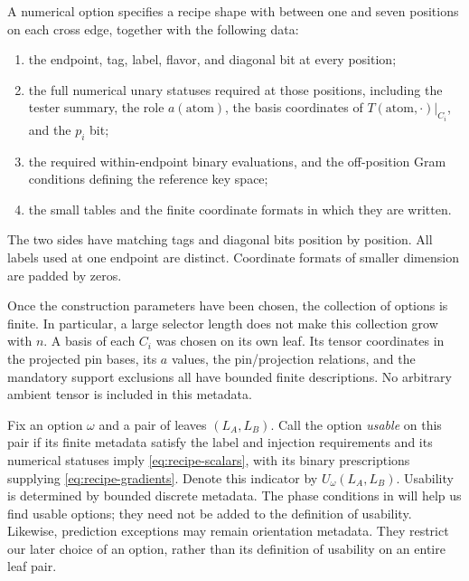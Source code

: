 \begin{definition}
\label{def:limit-option}
A numerical option specifies a recipe shape with between one and seven
positions on each cross edge, together with the following data:
\begin{enumerate}
\item the endpoint, tag, label, flavor, and diagonal bit at every position;
\item the full numerical unary statuses required at those positions,
including the tester summary, the role $a(\mathrm{atom})$, the basis
coordinates of $T(\mathrm{atom},\cdot)|_{C_i}$, and the $p_i$ bit;
\item the required within-endpoint binary evaluations, and the
off-position Gram conditions defining the reference key space;
\item the small tables and the finite coordinate formats in which they
are written.
\end{enumerate}
The two sides have matching tags and diagonal bits position by position.
All labels used at one endpoint are distinct. Coordinate formats of
smaller dimension are padded by zeros.
\end{definition}

Once the construction parameters have been chosen, the collection of
options is finite. In particular, a large selector length does not make
this collection grow with $n$. A basis of each $C_i$ was chosen on its
own leaf. Its tensor coordinates in the projected pin bases, its $a$
values, the pin/projection relations, and the mandatory support
exclusions all
have bounded finite descriptions. No arbitrary ambient tensor is included
in this metadata.

Fix an option $\omega$ and a pair of leaves $(L_A,L_B)$. Call the option
\emph{usable} on this pair if its finite metadata satisfy the label and
injection requirements and its numerical statuses imply
\eqref{eq:recipe-scalars}, with its binary prescriptions supplying
\eqref{eq:recipe-gradients}. Denote this indicator by
$U_\omega(L_A,L_B)$. Usability is determined by bounded discrete metadata.
The phase conditions in  will help us find
usable options; they need not be added to the definition of usability.
Likewise, prediction exceptions may remain orientation metadata. They
restrict our later choice of an option, rather than its definition of
usability on an entire leaf pair.

